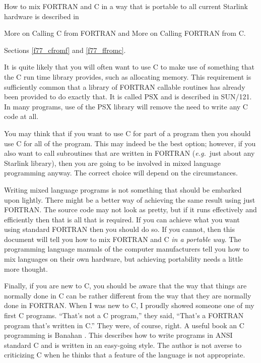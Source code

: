 \documentclass[twoside,11pt]{article}
\newcommand{\htmlref}[2]{#1}
\newcommand{\latex}[1]{#1}
\newcommand{\xref}[3]{#1}
\renewcommand{\_}{\texttt{\symbol{95}}}
\begin{document}
How to mix FORTRAN and C in a way that is portable to all current Starlink 
hardware is described in
\begin{htmlonly}
\htmlref{More on Calling C from FORTRAN}{f77_cfromf}
and
\htmlref{More on Calling FORTRAN from C}{f77_ffromc}. 
\end{htmlonly}
\latex{Sections \ref{f77_cfromf} and \ref{f77_ffromc}.}

It is quite likely that you will often want to use C to make use of something
that the C run time library provides, such as allocating memory. This
requirement is sufficiently common that a library of FORTRAN callable routines
has already been provided to do exactly that. 
It is called PSX and is described in 
\xref{SUN/121}{sun121}{}. 
In many programs, use of the PSX library will remove the need to write any C 
code at all.

You may think that if you want to use C for part of a program then you should
use C for all of the program. This may indeed be the best option; however, if
you also want to call subroutines that are written in FORTRAN ({\em{e.g.}}\ 
just about any Starlink library), then you are going to be involved in mixed 
language programming anyway. 
The correct choice will depend on the circumstances.

Writing mixed language programs is not something that should be embarked upon
lightly. There might be a better way of achieving the same result using just
FORTRAN\@. 
The source code may not look as pretty, but if it runs effectively and
efficiently then that is all that is required. If you can achieve what you want
using standard FORTRAN then you should do so. If you cannot, then this document
will tell you how to mix FORTRAN and C \textit{in a portable way}. 
The programming language manuals of the computer manufacturers tell you how to 
mix languages on their own hardware, but achieving portability needs a little 
more thought.

Finally, if you are new to C, you should be aware that the way that things are
normally done in C can be rather different from the way that they are normally
done in FORTRAN\@. When I was new to C, I proudly showed someone one of my first
C programs. ``That's not a C program,'' they said,  ``That's a FORTRAN program
that's written in C\@.'' They were, of course, right. A useful book an C
programming is Banahan \cite{Banahan}. This describes how to write programs in
ANSI standard C and is written in an easy-going style. The author is not averse
to criticizing C when he thinks that a feature of the language is not
appropriate.
\end{document}
